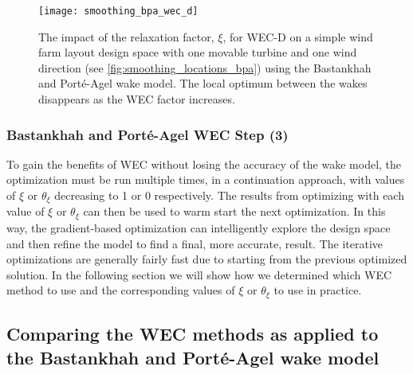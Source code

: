 \documentclass[a4paper]{jpconf}
\begin{document}
\begin{figure}[ht]
	\begin{minipage}[t]{0.47\textwidth}
		\centering
		\texttt{[image: smoothing\_bpa\_wec\_d]}
		\caption{The impact of the relaxation factor, $\xi$, for WEC-D on a simple wind farm layout design space with one movable turbine and one wind direction (see \cref{fig:smoothing_locations_bpa}) using the Bastankhah and Port\'{e}-Agel wake model. The local optimum between the wakes disappears as the WEC factor increases.}
		\label{fig:smoothing_bpa_wec_d}
	\end{minipage} %
\end{figure}

\subsubsection{Bastankhah and Port\'e-Agel WEC Step (3)}
To gain the benefits of WEC without losing the accuracy of the wake model, the optimization must be run multiple times, in a continuation approach, with values of $\xi$ or $\theta_\xi$ decreasing to 1 or 0 respectively. The results from optimizing with each value of $\xi$ or $\theta_\xi$ can then be used to warm start the next optimization. In this way, the gradient-based optimization can intelligently explore the design space and then refine the model to find a final, more accurate, result. The iterative optimizations are generally fairly fast due to starting from the previous optimized solution. In the following section we will show how we determined which WEC method to use and the corresponding values of $\xi$ or $\theta_\xi$ to use in practice.

\subsection{Comparing the WEC methods as applied to the Bastankhah and Port\'e-Agel wake model}\label{sec:bpa_wec_comparison}
\end{document}

